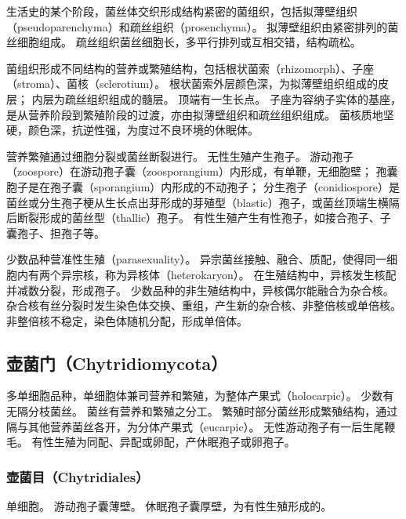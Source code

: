\documentclass[11pt]{article}
\begin{document}
\newline

生活史的某个阶段，菌丝体交织形成结构紧密的菌组织，包括拟薄壁组织（pseudoparenchyma）和疏丝组织（prosenchyma）。
拟薄壁组织由紧密排列的菌丝细胞组成。
疏丝组织菌丝细胞长，多平行排列或互相交错，结构疏松。

\newline

菌组织形成不同结构的营养或繁殖结构，包括根状菌索（rhizomorph）、子座（stroma）、菌核（sclerotium）。
根状菌索外层颜色深，为拟薄壁组织组成的皮层；
内层为疏丝组织组成的髓层。
顶端有一生长点。
子座为容纳子实体的基座，是从营养阶段到繁殖阶段的过渡，亦由拟薄壁组织和疏丝组织组成。
菌核质地坚硬，颜色深，抗逆性强，为度过不良环境的休眠体。

\newline

营养繁殖通过细胞分裂或菌丝断裂进行。
无性生殖产生孢子。
游动孢子（zoospore）在游动孢子囊（zoosporangium）内形成，有单鞭，无细胞壁；
孢囊胞子是在孢子囊（sporangium）内形成的不动孢子；
分生孢子（conidiospore）是菌丝或分生孢子梗从生长点出芽形成的芽殖型（blastic）孢子，或菌丝顶端生横隔后断裂形成的菌丝型（thallic）孢子。
有性生殖产生有性孢子，如接合孢子、子囊孢子、担孢子等。

\newline

少数品种营准性生殖（parasexuality）。
异宗菌丝接触、融合、质配，使得同一细胞内有两个异宗核，称为异核体（heterokaryon）。
在生殖结构中，异核发生核配并减数分裂，形成孢子。
少数品种的非生殖结构中，异核偶尔能融合为杂合核。
杂合核有丝分裂时发生染色体交换、重组，产生新的杂合核、非整倍核或单倍核。
非整倍核不稳定，染色体随机分配，形成单倍体。

\subsection{壶菌门（Chytridiomycota）}
多单细胞品种，单细胞体兼司营养和繁殖，为整体产果式（holocarpic）。
少数有无隔分枝菌丝。
菌丝有营养和繁殖之分工。
繁殖时部分菌丝形成繁殖结构，通过隔与其他营养菌丝各开，为分体产果式（eucarpic）。
无性游动孢子有一后生尾鞭毛。
有性生殖为同配、异配或卵配，产休眠孢子或卵孢子。

\subsubsection{壶菌目（Chytridiales）}
单细胞。
游动孢子囊薄壁。
休眠孢子囊厚壁，为有性生殖形成的。

\newline
\end{document}
